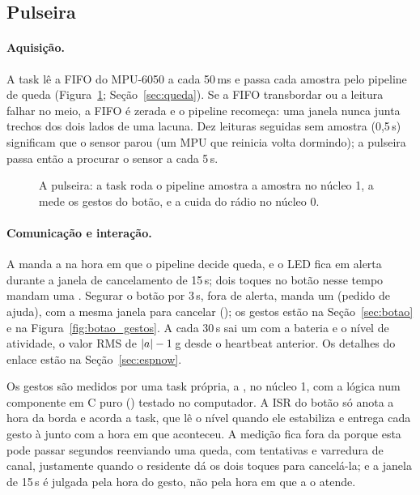 \subsection{Pulseira}

\paragraph{Aquisição.} A task  lê a FIFO do MPU-6050 a cada 50\,ms e passa
cada amostra pelo pipeline de queda (Figura~\ref{fig:tasks_pulseira};
Seção~\ref{sec:queda}). Se a FIFO transbordar ou a leitura falhar no meio, a FIFO é zerada e
o pipeline recomeça: uma janela nunca junta trechos dos dois lados de uma lacuna. Dez leituras
seguidas sem amostra (0,5\,s) significam que o sensor parou (um MPU que reinicia volta
dormindo); a pulseira passa então a procurar o sensor a cada 5\,s.

\begin{figure}[H]
\centering
\resizebox{\linewidth}{!}{}
\caption{A pulseira: a task  roda o pipeline amostra a amostra no núcleo 1, a
 mede os gestos do botão, e a  cuida do rádio no núcleo 0.}
\label{fig:tasks_pulseira}
\end{figure}

\paragraph{Comunicação e interação.} A  manda a  na hora em que o
pipeline decide queda, e o LED fica em alerta durante a janela de cancelamento de 15\,s; dois
toques no botão nesse tempo mandam uma . Segurar o botão por 3\,s, fora de
alerta, manda um  (pedido de ajuda), com a mesma janela para cancelar
(); os gestos estão na Seção~\ref{sec:botao} e na
Figura~\ref{fig:botao_gestos}. A cada 30\,s sai um  com a bateria e o nível de
atividade, o valor RMS de $|a| - 1$\,g desde o heartbeat anterior. Os detalhes do enlace
estão na Seção~\ref{sec:espnow}.

Os gestos são medidos por uma task própria, a , no núcleo 1, com a lógica num
componente em C puro () testado no computador. A ISR do botão só anota a
hora da borda e acorda a task, que lê o nível quando ele estabiliza e entrega cada gesto à
 junto com a hora em que aconteceu. A medição fica fora da  porque esta
pode passar segundos reenviando uma queda, com tentativas e varredura de canal, justamente
quando o residente dá os dois toques para cancelá-la; e a janela de 15\,s é julgada pela hora
do gesto, não pela hora em que a  o atende.

